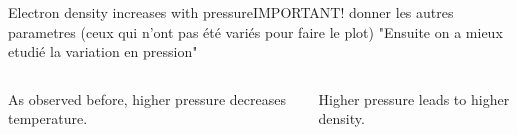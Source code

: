 \documentclass[10pt]{beamer}
\begin{document}
\begin{frame}{Electron density increases with pressure}{IMPORTANT! donner les autres parametres (ceux qui n'ont pas été variés pour faire le plot)}
    "Ensuite on a mieux etudié la variation en pression"
    \begin{columns}
        \centering

        As observed before, higher pressure decreases temperature.

        \centering
        Higher pressure leads to higher density.

    \end{columns}
\end{frame}
\end{document}
